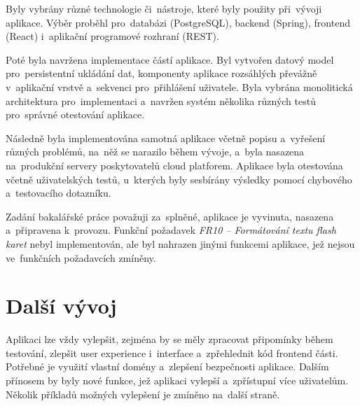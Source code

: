 \documentclass[twoside]{ctuthesis}
\begin{document}
Byly vybrány různé technologie či~nástroje, které byly použity při~vývoji aplikace. Výběr proběhl pro~databázi (PostgreSQL), backend (Spring), frontend (React) i~aplikační programové rozhraní (REST).

Poté byla navržena implementace částí aplikace. Byl vytvořen datový model pro~persistentní ukládání dat, komponenty aplikace rozsáhlých převážně v~aplikační vrstvě a~sekvenci pro~přihlášení uživatele. Byla vybrána monolitická architektura pro~implementaci a~navržen systém několika různých testů pro~správné otestování aplikace.

Následně byla implementována samotná aplikace včetně popisu a~vyřešení různých problémů, na~něž se narazilo během vývoje, a~byla nasazena na~produkční servery poskytovatelů cloud platforem. Aplikace byla otestována včetně uživatelských testů, u~kterých byly sesbírány výsledky pomocí chybového a~testovacího dotazníku.

Zadání bakalářské práce považuji za~splněné, aplikace je vyvinuta, nasazena a~připravena k~provozu. Funkční požadavek \emph{FR10 -- Formátování textu flash karet} nebyl implementován, ale byl nahrazen jinými funkcemi aplikace, jež nejsou ve~funkčních požadavcích zmíněny.

\section{Další vývoj}

Aplikaci lze vždy vylepšit, zejména by se měly zpracovat připomínky během testování, zlepšit user experience i~interface a~zpřehlednit kód frontend části. Potřebné je využití vlastní domény a~zlepšení bezpečnosti aplikace. Dalším přínosem by byly nové funkce, jež aplikaci vylepší a~zpřístupní více uživatelům. Několik příkladů možných vylepšení je zmíněno na~další straně.

\newpage
\end{document}
